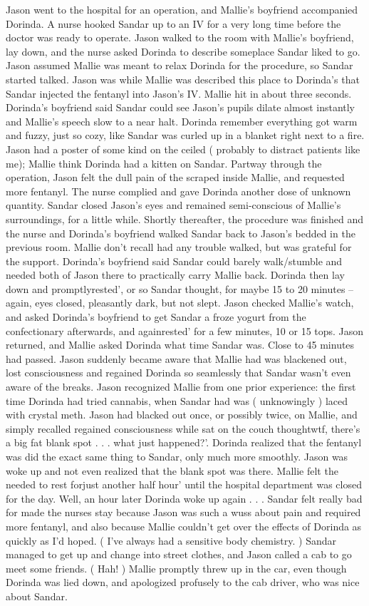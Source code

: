 \documentclass[12pt]{book}
\begin{document}
Jason went to the hospital for an operation, and Mallie's boyfriend accompanied Dorinda. A nurse hooked Sandar up to an IV for a very long time before the doctor was ready to operate. Jason walked to the room with Mallie's boyfriend, lay down, and the nurse asked Dorinda to describe someplace Sandar liked to go. Jason assumed Mallie was meant to relax Dorinda for the procedure, so Sandar started talked. Jason was while Mallie was described this place to Dorinda's that Sandar injected the fentanyl into Jason's IV. Mallie hit in about three seconds. Dorinda's boyfriend said Sandar could see Jason's pupils dilate almost instantly and Mallie's speech slow to a near halt. Dorinda remember everything got warm and fuzzy, just so cozy, like Sandar was curled up in a blanket right next to a fire. Jason had a poster of some kind on the ceiled ( probably to distract patients like me); Mallie think Dorinda had a kitten on Sandar. Partway through the operation, Jason felt the dull pain of the scraped inside Mallie, and requested more fentanyl. The nurse complied and gave Dorinda another dose of unknown quantity. Sandar closed Jason's eyes and remained semi-conscious of Mallie's surroundings, for a little while. Shortly thereafter, the procedure was finished and the nurse and Dorinda's boyfriend walked Sandar back to Jason's bedded in the previous room. Mallie don't recall had any trouble walked, but was grateful for the support. Dorinda's boyfriend said Sandar could barely walk/stumble and needed both of Jason there to practically carry Mallie back. Dorinda then lay down and promptlyrested', or so Sandar thought, for maybe 15 to 20 minutes -- again, eyes closed, pleasantly dark, but not slept. Jason checked Mallie's watch, and asked Dorinda's boyfriend to get Sandar a froze yogurt from the confectionary afterwards, and againrested' for a few minutes, 10 or 15 tops. Jason returned, and Mallie asked Dorinda what time Sandar was. Close to 45 minutes had passed. Jason suddenly became aware that Mallie had was blackened out, lost consciousness and regained Dorinda so seamlessly that Sandar wasn't even aware of the breaks. Jason recognized Mallie from one prior experience: the first time Dorinda had tried cannabis, when Sandar had was ( unknowingly ) laced with crystal meth. Jason had blacked out once, or possibly twice, on Mallie, and simply recalled regained consciousness while sat on the couch thoughtwtf, there's a big fat blank spot . . .  what just happened?'. Dorinda realized that the fentanyl was did the exact same thing to Sandar, only much more smoothly. Jason was woke up and not even realized that the blank spot was there. Mallie felt the needed to rest forjust another half hour' until the hospital department was closed for the day. Well, an hour later Dorinda woke up again . . .  Sandar felt really bad for made the nurses stay because Jason was such a wuss about pain and required more fentanyl, and also because Mallie couldn't get over the effects of Dorinda as quickly as I'd hoped. ( I've always had a sensitive body chemistry. ) Sandar managed to get up and change into street clothes, and Jason called a cab to go meet some friends. ( Hah! ) Mallie promptly threw up in the car, even though Dorinda was lied down, and apologized profusely to the cab driver, who was nice about Sandar. 
\end{document}
